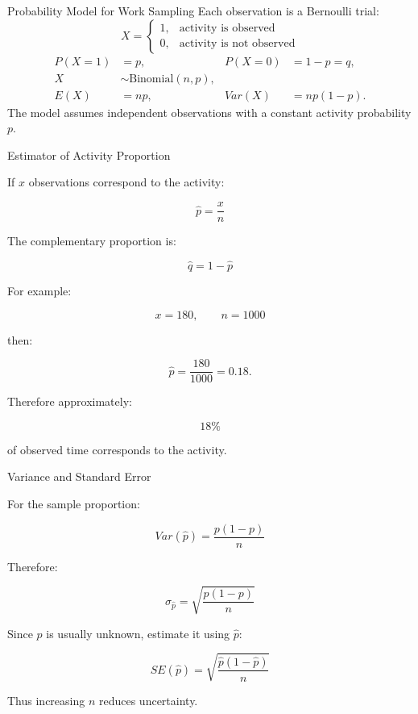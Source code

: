 \documentclass[aspectratio=169,10pt]{beamer}
\begin{document}

\begin{frame}{Probability Model for Work Sampling}
\small
Each observation is a Bernoulli trial:
\[
X=\begin{cases}1,&\text{activity is observed}\\0,&\text{activity is not observed}\end{cases}
\]
\begin{align*}
P(X=1)&=p, & P(X=0)&=1-p=q,\\
X&\sim\mathrm{Binomial}(n,p),\\
E(X)&=np, & Var(X)&=np(1-p).
\end{align*}
The model assumes independent observations with a constant activity probability $p$.
\end{frame}


\begin{frame}[shrink=18]{Estimator of Activity Proportion}
\small

If \(x\) observations correspond to the activity:

\[
\boxed{
\hat p=\frac{x}{n}
}
\]

The complementary proportion is:

\[
\boxed{
\hat q=1-\hat p
}
\]

For example:

\[
x=180,\qquad n=1000
\]

then:

\[
\hat p=\frac{180}{1000}=0.18.
\]

Therefore approximately:

\[
\boxed{
18\%
}
\]

of observed time corresponds to the activity.

\end{frame}


\begin{frame}[shrink=18]{Variance and Standard Error}
\small

For the sample proportion:

\[
Var(\hat p)
=
\frac{p(1-p)}{n}
\]

Therefore:

\[
\boxed{
\sigma_{\hat p}
=
\sqrt{
\frac{p(1-p)}{n}
}
}
\]

Since \(p\) is usually unknown, estimate it using \(\hat p\):

\[
\boxed{
SE(\hat p)
=
\sqrt{
\frac{\hat p(1-\hat p)}{n}
}
}
\]

Thus increasing \(n\) reduces uncertainty.

\end{frame}
\end{document}
